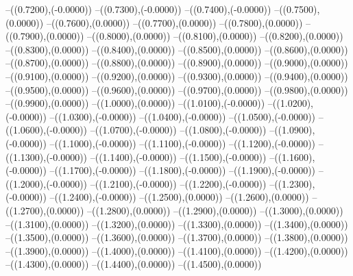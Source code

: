 {	--({\sx*(0.7200)},{\sy*(-0.0000)})
	--({\sx*(0.7300)},{\sy*(-0.0000)})
	--({\sx*(0.7400)},{\sy*(-0.0000)})
	--({\sx*(0.7500)},{\sy*(0.0000)})
	--({\sx*(0.7600)},{\sy*(0.0000)})
	--({\sx*(0.7700)},{\sy*(0.0000)})
	--({\sx*(0.7800)},{\sy*(0.0000)})
	--({\sx*(0.7900)},{\sy*(0.0000)})
	--({\sx*(0.8000)},{\sy*(0.0000)})
	--({\sx*(0.8100)},{\sy*(0.0000)})
	--({\sx*(0.8200)},{\sy*(0.0000)})
	--({\sx*(0.8300)},{\sy*(0.0000)})
	--({\sx*(0.8400)},{\sy*(0.0000)})
	--({\sx*(0.8500)},{\sy*(0.0000)})
	--({\sx*(0.8600)},{\sy*(0.0000)})
	--({\sx*(0.8700)},{\sy*(0.0000)})
	--({\sx*(0.8800)},{\sy*(0.0000)})
	--({\sx*(0.8900)},{\sy*(0.0000)})
	--({\sx*(0.9000)},{\sy*(0.0000)})
	--({\sx*(0.9100)},{\sy*(0.0000)})
	--({\sx*(0.9200)},{\sy*(0.0000)})
	--({\sx*(0.9300)},{\sy*(0.0000)})
	--({\sx*(0.9400)},{\sy*(0.0000)})
	--({\sx*(0.9500)},{\sy*(0.0000)})
	--({\sx*(0.9600)},{\sy*(0.0000)})
	--({\sx*(0.9700)},{\sy*(0.0000)})
	--({\sx*(0.9800)},{\sy*(0.0000)})
	--({\sx*(0.9900)},{\sy*(0.0000)})
	--({\sx*(1.0000)},{\sy*(0.0000)})
	--({\sx*(1.0100)},{\sy*(-0.0000)})
	--({\sx*(1.0200)},{\sy*(-0.0000)})
	--({\sx*(1.0300)},{\sy*(-0.0000)})
	--({\sx*(1.0400)},{\sy*(-0.0000)})
	--({\sx*(1.0500)},{\sy*(-0.0000)})
	--({\sx*(1.0600)},{\sy*(-0.0000)})
	--({\sx*(1.0700)},{\sy*(-0.0000)})
	--({\sx*(1.0800)},{\sy*(-0.0000)})
	--({\sx*(1.0900)},{\sy*(-0.0000)})
	--({\sx*(1.1000)},{\sy*(-0.0000)})
	--({\sx*(1.1100)},{\sy*(-0.0000)})
	--({\sx*(1.1200)},{\sy*(-0.0000)})
	--({\sx*(1.1300)},{\sy*(-0.0000)})
	--({\sx*(1.1400)},{\sy*(-0.0000)})
	--({\sx*(1.1500)},{\sy*(-0.0000)})
	--({\sx*(1.1600)},{\sy*(-0.0000)})
	--({\sx*(1.1700)},{\sy*(-0.0000)})
	--({\sx*(1.1800)},{\sy*(-0.0000)})
	--({\sx*(1.1900)},{\sy*(-0.0000)})
	--({\sx*(1.2000)},{\sy*(-0.0000)})
	--({\sx*(1.2100)},{\sy*(-0.0000)})
	--({\sx*(1.2200)},{\sy*(-0.0000)})
	--({\sx*(1.2300)},{\sy*(-0.0000)})
	--({\sx*(1.2400)},{\sy*(-0.0000)})
	--({\sx*(1.2500)},{\sy*(0.0000)})
	--({\sx*(1.2600)},{\sy*(0.0000)})
	--({\sx*(1.2700)},{\sy*(0.0000)})
	--({\sx*(1.2800)},{\sy*(0.0000)})
	--({\sx*(1.2900)},{\sy*(0.0000)})
	--({\sx*(1.3000)},{\sy*(0.0000)})
	--({\sx*(1.3100)},{\sy*(0.0000)})
	--({\sx*(1.3200)},{\sy*(0.0000)})
	--({\sx*(1.3300)},{\sy*(0.0000)})
	--({\sx*(1.3400)},{\sy*(0.0000)})
	--({\sx*(1.3500)},{\sy*(0.0000)})
	--({\sx*(1.3600)},{\sy*(0.0000)})
	--({\sx*(1.3700)},{\sy*(0.0000)})
	--({\sx*(1.3800)},{\sy*(0.0000)})
	--({\sx*(1.3900)},{\sy*(0.0000)})
	--({\sx*(1.4000)},{\sy*(0.0000)})
	--({\sx*(1.4100)},{\sy*(0.0000)})
	--({\sx*(1.4200)},{\sy*(0.0000)})
	--({\sx*(1.4300)},{\sy*(0.0000)})
	--({\sx*(1.4400)},{\sy*(0.0000)})
	--({\sx*(1.4500)},{\sy*(0.0000)})
}
